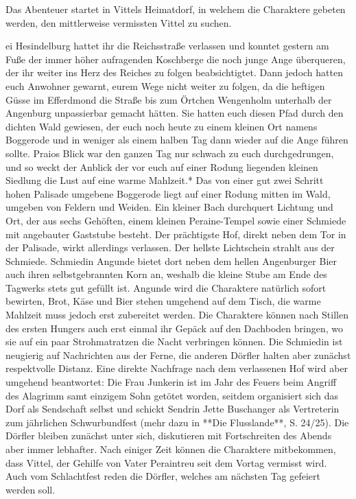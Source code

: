 \platz
Das Abenteuer startet in Vittels Heimatdorf, in welchem die Charaktere gebeten werden, den mittlerweise vermissten Vittel zu suchen. 





ei Hesindelburg hattet ihr die Reichsstraße verlassen und konntet gestern am Fuße der immer höher aufragenden Koschberge die noch junge Ange überqueren, der ihr weiter ins Herz des Reiches zu folgen beabsichtigtet. Dann jedoch hatten euch Anwohner gewarnt, eurem Wege nicht weiter zu folgen, da die heftigen Güsse im Efferdmond die Straße bis zum Örtchen Wengenholm unterhalb der Angenburg unpassierbar gemacht hätten. Sie hatten euch diesen Pfad durch den dichten Wald gewiesen, der euch noch heute zu einem kleinen Ort namens Boggerode und in weniger als einem halben Tag dann wieder auf die Ange führen sollte. Praios Blick war den ganzen Tag nur schwach zu euch durchgedrungen, und so weckt der Anblick der vor euch auf einer Rodung liegenden kleinen Siedlung die Lust auf eine warme Mahlzeit.*
\platz
Das von einer gut zwei Schritt hohen Palisade umgebene Boggerode liegt auf einer Rodung mitten im Wald, umgeben von Feldern und Weiden. Ein kleiner Bach durchquert Lichtung und Ort, der aus sechs Gehöften, einem kleinen Peraine-Tempel sowie einer Schmiede mit angebauter Gaststube besteht. Der prächtigste Hof, direkt neben dem Tor in der Palisade, wirkt allerdings verlassen. Der hellste Lichtschein strahlt aus der Schmiede. Schmiedin Angunde bietet dort neben dem hellen Angenburger Bier auch ihren selbstgebrannten Korn an, weshalb die kleine Stube am Ende des Tagwerks stets gut gefüllt ist. Angunde wird die Charaktere natürlich sofort bewirten, Brot, Käse und Bier stehen umgehend auf dem Tisch, die warme Mahlzeit muss jedoch erst zubereitet werden. Die Charaktere können nach Stillen des ersten Hungers auch erst einmal ihr Gepäck auf den Dachboden bringen, wo sie auf ein paar Strohmatratzen die Nacht verbringen können. Die Schmiedin ist neugierig auf Nachrichten aus der Ferne, die anderen Dörfler halten aber zunächst respektvolle Distanz. Eine direkte Nachfrage nach dem verlassenen Hof wird aber umgehend beantwortet: Die Frau Junkerin ist im Jahr des Feuers beim Angriff des Alagrimm samt einzigem Sohn getötet worden, seitdem organisiert sich das Dorf als Sendschaft selbst und schickt Sendrin Jette Buschanger als Vertreterin zum jährlichen Schwurbundfest (mehr dazu in **Die Flusslande**, S. 24/25).
\platz
Die Dörfler bleiben zunächst unter sich, diskutieren mit Fortschreiten des Abends aber immer lebhafter. Nach einiger Zeit können die Charaktere mitbekommen, dass Vittel, der Gehilfe von Vater Peraintreu seit dem Vortag vermisst wird. Auch vom Schlachtfest reden die Dörfler, welches am nächsten Tag gefeiert werden soll.


